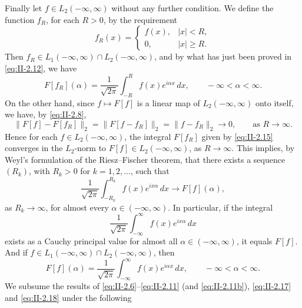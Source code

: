 Finally let $f\in L_{2}(-\infty,\infty)$ without any further condition. We define the function $f_{R}$, for each $R>0$, by the requirement
\[
f_{R}(x)=
\begin{cases}
f(x), & |x|<R,\\
0, & |x|\ge R.
\end{cases}
\]
Then $f_{R}\in L_{1}(-\infty,\infty)\cap L_{2}(-\infty,\infty)$, and by what has just been proved in \eqref{eq:II-2.12}, we have
\begin{equation}\tag{2.15}\label{eq:II-2.15}
F[f_{R}](\alpha)=\frac{1}{\sqrt{2\pi}}\int_{-R}^{R}f(x)e^{i\alpha x}\,dx,\qquad-\infty<\alpha<\infty.
\end{equation}
On the other hand, since $f\mapsto F[f]$ is a linear map of $L_{2}(-\infty,\infty)$ onto itself, we have, by \eqref{eq:II-2.8},
\begin{equation}\tag{2.16}\label{eq:II-2.16}
\bigl\|F[f]-F[f_{R}]\bigr\|_{2}
=\bigl\|F[f-f_{R}]\bigr\|_{2}
=\|f-f_{R}\|_{2}\to 0,\qquad\text{as }R\to\infty.
\end{equation}
Hence for each $f\in L_{2}(-\infty,\infty)$, the integral $F[f_{R}]$ given by \eqref{eq:II-2.15} converges in the $L_{2}$-norm to $F[f]\in L_{2}(-\infty,\infty)$, as $R\to\infty$. This implies, by Weyl's formulation of the Riesz--Fischer theorem, that there exists a sequence $(R_{k})$, with $R_{k}>0$ for $k=1,2,\dots$, such that
\[
\frac{1}{\sqrt{2\pi}}\int_{-R_{k}}^{R_{k}}f(x)e^{ix\alpha}\,dx\to F[f](\alpha),
\]
as $R_{k}\to\infty$, for almost every $\alpha\in(-\infty,\infty)$. In particular, if the integral
\begin{equation}\tag{2.17}\label{eq:II-2.17}
\frac{1}{\sqrt{2\pi}}\int_{-\infty}^{\infty}f(x)e^{ix\alpha}\,dx
\end{equation}
exists as a Cauchy principal value for almost all $\alpha\in(-\infty,\infty)$, it equals $F[f]$. And if $f\in L_{1}(-\infty,\infty)\cap L_{2}(-\infty,\infty)$, then
\begin{equation}\tag{2.18}\label{eq:II-2.18}
F[f](\alpha)=\frac{1}{\sqrt{2\pi}}\int_{-\infty}^{\infty}f(x)e^{i\alpha x}\,dx,\qquad-\infty<\alpha<\infty.
\end{equation}
We subsume the results of \eqref{eq:II-2.6}--\eqref{eq:II-2.11} (and \eqref{eq:II-2.11b}), \eqref{eq:II-2.17} and \eqref{eq:II-2.18} under the following

